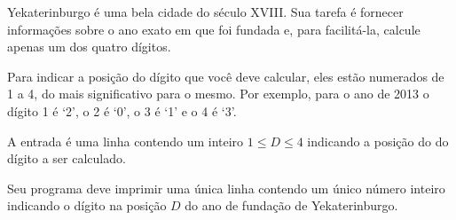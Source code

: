 %
%
%

Yekaterinburgo é uma bela cidade do século XVIII. Sua tarefa é fornecer informações sobre o ano exato em que foi fundada e, para facilitá-la, calcule apenas um dos quatro dígitos.

Para indicar a posição do dígito que você deve calcular, eles estão numerados de 1 a 4, do mais significativo para o mesmo. Por exemplo, para o ano de 2013 o dígito 1 é `2', o 2 é `0', o 3 é `1' e o 4 é `3'.


\Entrada%
A entrada é uma linha contendo um inteiro $1 \leq D \leq 4$ indicando a posição do do dígito a ser calculado.

\Saida%
Seu programa deve imprimir uma única linha contendo um único número inteiro indicando o dígito na posição $D$ do ano de fundação de Yekaterinburgo.

%

